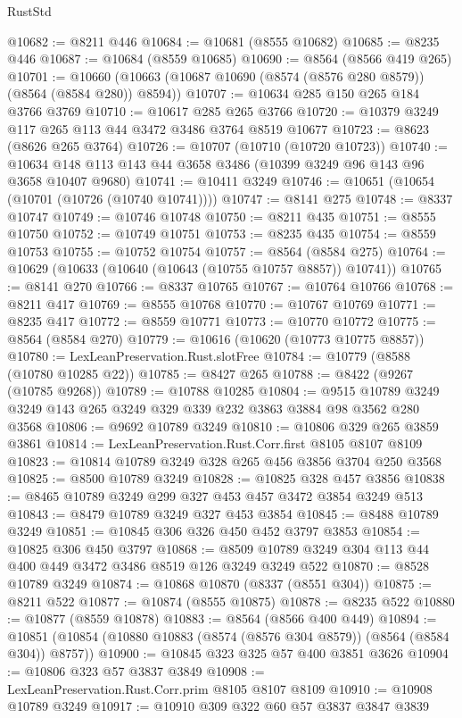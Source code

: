 \begin{lexlean}{RustStd}
\begin{coremodule}
@10682 := @8211 @446
@10684 := @10681 (@8555 @10682)
@10685 := @8235 @446
@10687 := @10684 (@8559 @10685)
@10690 := @8564 (@8566 @419 @265)
@10701 := @10660 (@10663 (@10687 @10690 (@8574 (@8576 @280 @8579)) (@8564 (@8584 @280)) @8594))
@10707 := @10634 @285 @150 @265 @184 @3766 @3769
@10710 := @10617 @285 @265 @3766
@10720 := @10379 @3249 @117 @265 @113 @44 @3472 @3486 @3764 @8519 @10677
@10723 := @8623 (@8626 @265 @3764)
@10726 := @10707 (@10710 (@10720 @10723))
@10740 := @10634 @148 @113 @143 @44 @3658 @3486 (@10399 @3249 @96 @143 @96 @3658 @10407 @9680)
@10741 := @10411 @3249
@10746 := @10651 (@10654 (@10701 (@10726 (@10740 @10741))))
@10747 := @8141 @275
@10748 := @8337 @10747
@10749 := @10746 @10748
@10750 := @8211 @435
@10751 := @8555 @10750
@10752 := @10749 @10751
@10753 := @8235 @435
@10754 := @8559 @10753
@10755 := @10752 @10754
@10757 := @8564 (@8584 @275)
@10764 := @10629 (@10633 (@10640 (@10643 (@10755 @10757 @8857)) @10741))
@10765 := @8141 @270
@10766 := @8337 @10765
@10767 := @10764 @10766
@10768 := @8211 @417
@10769 := @8555 @10768
@10770 := @10767 @10769
@10771 := @8235 @417
@10772 := @8559 @10771
@10773 := @10770 @10772
@10775 := @8564 (@8584 @270)
@10779 := @10616 (@10620 (@10773 @10775 @8857))
@10780 := LexLeanPreservation.Rust.slotFree
@10784 := @10779 (@8588 (@10780 @10285 @22))
@10785 := @8427 @265
@10788 := @8422 (@9267 (@10785 @9268))
@10789 := @10788 @10285
@10804 := @9515 @10789 @3249 @3249 @143 @265 @3249 @329 @339 @232 @3863 @3884 @98 @3562 @280 @3568
@10806 := @9692 @10789 @3249
@10810 := @10806 @329 @265 @3859 @3861
@10814 := LexLeanPreservation.Rust.Corr.first @8105 @8107 @8109
@10823 := @10814 @10789 @3249 @328 @265 @456 @3856 @3704 @250 @3568
@10825 := @8500 @10789 @3249
@10828 := @10825 @328 @457 @3856
@10838 := @8465 @10789 @3249 @299 @327 @453 @457 @3472 @3854 @3249 @513
@10843 := @8479 @10789 @3249 @327 @453 @3854
@10845 := @8488 @10789 @3249
@10851 := @10845 @306 @326 @450 @452 @3797 @3853
@10854 := @10825 @306 @450 @3797
@10868 := @8509 @10789 @3249 @304 @113 @44 @400 @449 @3472 @3486 @8519 @126 @3249 @3249 @522
@10870 := @8528 @10789 @3249
@10874 := @10868 @10870 (@8337 (@8551 @304))
@10875 := @8211 @522
@10877 := @10874 (@8555 @10875)
@10878 := @8235 @522
@10880 := @10877 (@8559 @10878)
@10883 := @8564 (@8566 @400 @449)
@10894 := @10851 (@10854 (@10880 @10883 (@8574 (@8576 @304 @8579)) (@8564 (@8584 @304)) @8757))
@10900 := @10845 @323 @325 @57 @400 @3851 @3626
@10904 := @10806 @323 @57 @3837 @3849
@10908 := LexLeanPreservation.Rust.Corr.prim @8105 @8107 @8109
@10910 := @10908 @10789 @3249
@10917 := @10910 @309 @322 @60 @57 @3837 @3847 @3839

\end{coremodule}
\end{lexlean}
